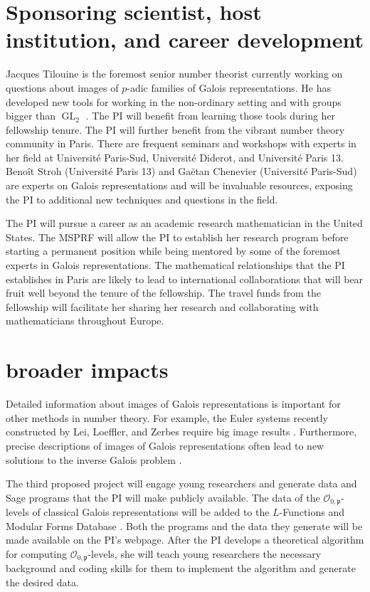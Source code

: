 \documentclass[11pt]{amsart}
\theoremstyle{definition}
\theoremstyle{remark}
\def\OK{\mathcal{O}}
\def\p{\mathfrak{p}}
\DeclareMathOperator{\GL}{GL}
\begin{document}
\section*{Sponsoring scientist, host institution, and career development}
Jacques Tilouine is the foremost senior number theorist currently working on questions about images of $p$-adic families of Galois representations.  He has developed new tools for working in the non-ordinary setting \cite{CIT15} and with groups bigger than $\GL_2$ \cite{HidaTilouine15}.  The PI will benefit from learning those tools during her fellowship tenure.  The PI will further benefit from the vibrant number theory community in Paris.  There are frequent seminars and workshops with experts in her field at Universit\'e Paris-Sud, Universit\'e Diderot, and Universit\'e Paris 13.  Beno\^{i}t Stroh (Universit\'e Paris 13) and Ga\"{e}tan Chenevier (Universit\'e Paris-Sud) are experts on Galois representations and will be invaluable resources, exposing the PI to additional new techniques and questions in the field.  

The PI will pursue a career as an academic research mathematician in the United States.  The MSPRF will allow the PI to establish her research program before starting a permanent position while being mentored by some of the foremost experts in Galois representations.  The mathematical relationships that the PI establishes in Paris are likely to lead to international collaborations that will bear fruit well beyond the tenure of the fellowship.  The travel funds from the fellowship will facilitate her sharing her research and collaborating with mathematicians throughout Europe.

\section*{broader impacts}
Detailed information about images of Galois representations is important for other methods in number theory.  For example, the Euler systems recently constructed by Lei, Loeffler, and Zerbes require big image results \cite{LLZ14, Loeffler14}.  Furthermore, precise descriptions of images of Galois representations often lead to new solutions to the inverse Galois problem \cite{Yun14, Zywina15a}.

The third proposed project will engage young researchers and generate data and Sage programs that the PI will make publicly available.  The data of the $\OK_{0, \p}$-levels of classical Galois representations will be added to the $L$-Functions and Modular Forms Database \cite{LMFDB}.  Both the programs and the data they generate will be made available on the PI's webpage.  After the PI develops a theoretical algorithm for computing $\OK_{0, \p}$-levels, she will teach young researchers the necessary background and coding skills for them to implement the algorithm and generate the desired data.
\end{document}
